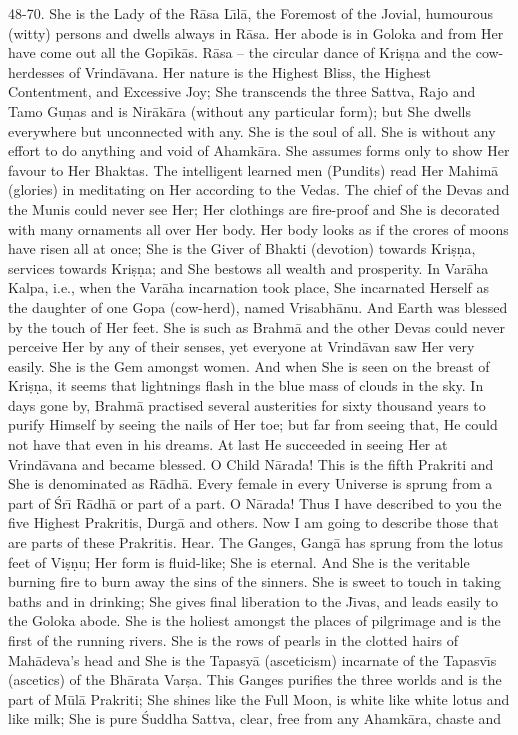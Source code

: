 48-70. She is the Lady of the R\=asa L\={\i}l\=a, the Foremost of the Jovial, humourous (witty) persons and dwells always in R\=asa. Her abode is in Goloka and from Her have come out all the Gop\={\i}k\=as. R\=asa -- the circular dance of Kri\d{s}\d{n}a and the cow-herdesses of Vrind\=avana. Her nature is the Highest Bliss, the Highest Contentment, and Excessive Joy; She transcends the three Sattva, Rajo and Tamo Gu\d{n}as and is Nir\=ak\=ara (without any particular form); but She dwells everywhere but unconnected with any. She is the soul of all. She is without any effort to do anything and void of Ahamk\=ara. She assumes forms only to show Her favour to Her Bhaktas. The intelligent learned men (Pundits) read Her Mahim\=a (glories) in meditating on Her according to the Vedas. The chief of the Devas and the Munis could never see Her; Her clothings are fire-proof and She is decorated with many ornaments all over Her body. Her body looks as if the crores of moons have risen all at once; She is the Giver of Bhakti (devotion) towards Kri\d{s}\d{n}a, services towards Kri\d{s}\d{n}a; and She bestows all wealth and prosperity. In Var\=aha Kalpa, i.e., when the Var\=aha incarnation took place, She incarnated Herself as the daughter of one Gopa (cow-herd), named Vrisabh\=anu. And Earth was blessed by the touch of Her feet. She is such as Brahm\=a and the other Devas could never perceive Her by any of their senses, yet everyone at Vrind\=avan saw Her very easily. She is the Gem amongst women. And when She is seen on the breast of Kri\d{s}\d{n}a, it seems that lightnings flash in the blue mass of clouds in the sky. In days gone by, Brahm\=a practised several austerities for sixty thousand years to purify Himself by seeing the nails of Her toe; but far from seeing that, He could not have that even in his dreams. At last He succeeded in seeing Her at Vrind\=avana and became blessed. O Child N\=arada! This is the fifth Prakriti and She is denominated as R\=adh\=a. Every female in every Universe is sprung from a part of \'Sr\={\i} R\=adh\=a or part of a part. O N\=arada! Thus I have described to you the five Highest Prakritis, Durg\=a and others. Now I am going to describe those that are parts of these Prakritis. Hear. The Ganges, Gang\=a has sprung from the lotus feet of Vi\d{s}\d{n}u; Her form is fluid-like; She is eternal. And She is the veritable burning fire to burn away the sins of the sinners. She is sweet to touch in taking baths and in drinking; She gives final liberation to the J\={\i}vas, and leads easily to the Goloka abode. She is the holiest amongst the places of pilgrimage and is the first of the running rivers. She is the rows of pearls in the clotted hairs of Mah\=adeva's head and She is the Tapasy\=a (asceticism) incarnate of the Tapasv\={\i}s (ascetics) of the Bh\=arata Var\d{s}a. This Ganges purifies the three worlds and is the part of M\=ul\=a Prakriti; She shines like the Full Moon, is white like white lotus and like milk; She is pure \'Suddha Sattva, clear, free from any Ahamk\=ara, chaste and

